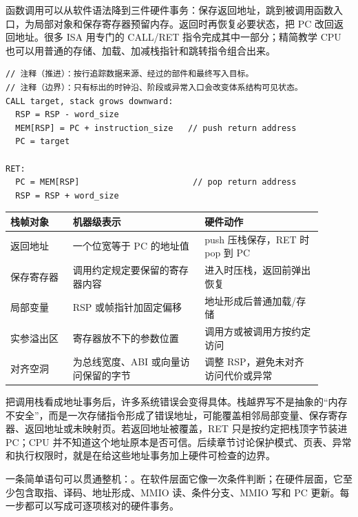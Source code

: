 函数调用可以从软件语法降到三件硬件事务：保存返回地址，跳到被调用函数入口，为局部对象和保存寄存器预留内存。返回时再恢复必要状态，把 PC 改回返回地址。很多 ISA 用专门的 CALL/RET 指令完成其中一部分；精简教学 CPU 也可以用普通的存储、加载、加减栈指针和跳转指令组合出来。

\begin{lstlisting}
// 注释（推进）：按行追踪数据来源、经过的部件和最终写入目标。
// 注释（边界）：只有标出的时钟沿、阶段或异常入口会改变体系结构可见状态。
CALL target, stack grows downward:
  RSP = RSP - word_size
  MEM[RSP] = PC + instruction_size   // push return address
  PC = target

RET:
  PC = MEM[RSP]                       // pop return address
  RSP = RSP + word_size
\end{lstlisting}

\begin{longtable}{L{0.18\linewidth}L{0.38\linewidth}L{0.34\linewidth}}
\toprule
栈帧对象 & 机器级表示 & 硬件动作 \\
\midrule
返回地址 & 一个位宽等于 PC 的地址值 & push 压栈保存，RET 时 pop 到 PC \\\tablerowrule
保存寄存器 & 调用约定规定要保留的寄存器内容 & 进入时压栈，返回前弹出恢复 \\\tablerowrule
局部变量 & RSP 或帧指针加固定偏移 & 地址形成后普通加载/存储 \\\tablerowrule
实参溢出区 & 寄存器放不下的参数位置 & 调用方或被调用方按约定访问 \\\tablerowrule
对齐空洞 & 为总线宽度、ABI 或向量访问保留的字节 & 调整 RSP，避免未对齐访问代价或异常 \\
\bottomrule
\end{longtable}

把调用栈看成地址事务后，许多系统错误会变得具体。栈越界写不是抽象的“内存不安全”，而是一次存储指令形成了错误地址，可能覆盖相邻局部变量、保存寄存器、返回地址或未映射页。若返回地址被覆盖，RET 只是按约定把栈顶字节装进 PC；CPU 并不知道这个地址原本是否可信。后续章节讨论保护模式、页表、异常和执行权限时，就是在给这些地址事务加上硬件可检查的边界。

一条简单语句可以贯通整机：。在软件层面它像一次条件判断；在硬件层面，它至少包含取指、译码、地址形成、MMIO 读、条件分支、MMIO 写和 PC 更新。每一步都可以写成可逐项核对的硬件事务。


